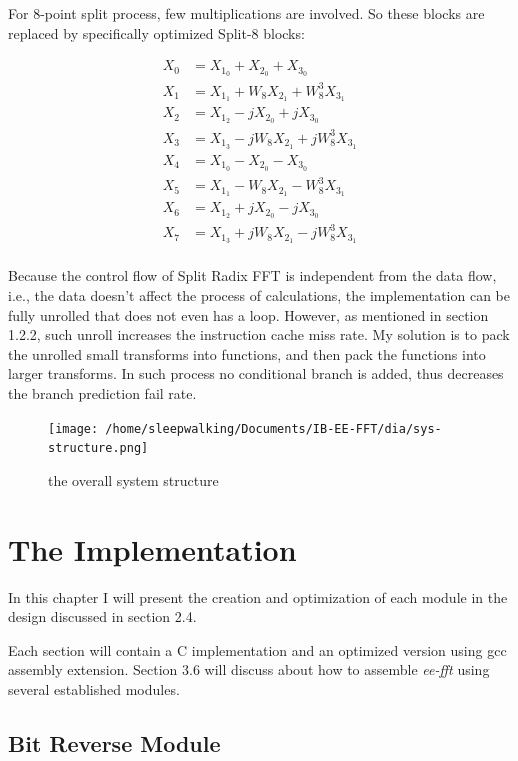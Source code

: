 \documentclass[a4paper]{report}
\begin{document}
	For 8-point split process, few multiplications are involved. So these blocks are replaced by specifically optimized Split-8 blocks:

\[\begin{split}
  X_{0} & = X_{1_0} + X_{2_0} + X_{3_0}\\
  X_{1} & = X_{1_1} + W_8 X_{2_1} + W_8^3 X_{3_1}\\
  X_{2} & = X_{1_2} - jX_{2_0} + j X_{3_0}\\
  X_{3} & = X_{1_3} - jW_8 X_{2_1} + jW_8^3 X_{3_1}\\
  X_{4} & = X_{1_0} - X_{2_0} - X_{3_0}\\
  X_{5} & = X_{1_1} - W_8 X_{2_1} - W_8^3 X_{3_1}\\
  X_{6} & = X_{1_2} + jX_{2_0} - jX_{3_0}\\
  X_{7} & = X_{1_3} + jW_8 X_{2_1} - jW_8^3 X_{3_1}\\
\end{split}\]

	Because the control flow of Split Radix FFT is independent from the data flow, i.e., the data doesn't affect the process of calculations, the implementation can be fully unrolled that does not even has a loop. However, as mentioned in section 1.2.2, such unroll increases the instruction cache miss rate. My solution is to pack the unrolled small transforms into functions, and then pack the functions into larger transforms. In such process no conditional branch is added, thus decreases the branch prediction fail rate.

\begin{figure}[htp]
\centering
\texttt{[image: /home/sleepwalking/Documents/IB-EE-FFT/dia/sys-structure.png]}
\caption{the overall system structure}
\label{}
\end{figure}
\chapter{The Implementation} \indent

	In this chapter I will present the creation and optimization of each module in the design discussed in section 2.4.
	
	Each section will contain a C implementation and an optimized version using gcc assembly extension. Section 3.6 will discuss about how to assemble \textit{ee-fft} using several established modules.

\section{Bit Reverse Module} \indent
\end{document}
